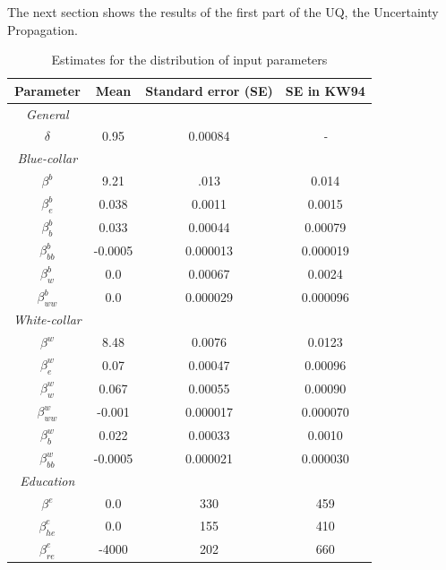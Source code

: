 The next section shows the results of the first part of the UQ, the Uncertainty Propagation.


\setlength{\tabcolsep}{18pt} %
\begin{table}[H] 
	\centering
	\begin{threeparttable}
		\caption[Model Parametrization]{Estimates for the distribution of input parameters}
		\label{tab:params}
		\renewcommand{\arraystretch}{1.2}%
		\begin{tabular}{cS[table-format=3.2]S[table-format=3.2]S[table-format=3.2]}
			\toprule
			{Parameter}     & {Mean}   & {Standard error (SE)} & {SE in KW94} \\ \midrule
			\textit{General} \\
			$\delta$ & 0.95   & 0.00084 & \textit{-}    \\    \midrule
			\textit{Blue-collar}\\    
			$\beta^b$ & 9.21   & .013            & 0.014      \\
			$\beta_e^b$ & 0.038  &    0.0011        & 0.0015       \\
			$\beta^b_b$ & 0.033  & 0.00044            & 0.00079       \\
			$\beta^b_{bb}$ & -0.0005 & 0.000013           & 0.000019       \\
			$\beta^b_w$ & 0.0    & 0.00067             & 0.0024      \\
			$\beta^b_{ww}$ & 0.0    & 0.000029           & 0.000096       \\ \midrule
			\textit{White-collar}\\
			$\beta^w$ & 8.48   & 0.0076             & 0.0123      \\
			$\beta^w_e$ & 0.07   & 0.00047          & 0.00096       \\
			$\beta^w_w$ & 0.067  & 0.00055            & 0.00090      \\
			$\beta^w_{ww}$ & -0.001  & 0.000017           & 0.000070     \\
			$\beta^w_b$ & 0.022  & 0.00033           & 0.0010      \\
			$\beta^w_{bb}$ & -0.0005 & 0.000021         & 0.000030      \\ \midrule
			\textit{Education} \\
			$\beta^e$     & 0.0    & 330                & 459       \\
			$\beta_{he}^e$     & 0.0    & 155               & 410       \\
			$\beta_{re}^e$     & -4000   & 202                & 660       \\ \midrule

\end{tabular}
\end{threeparttable}
\end{table}
